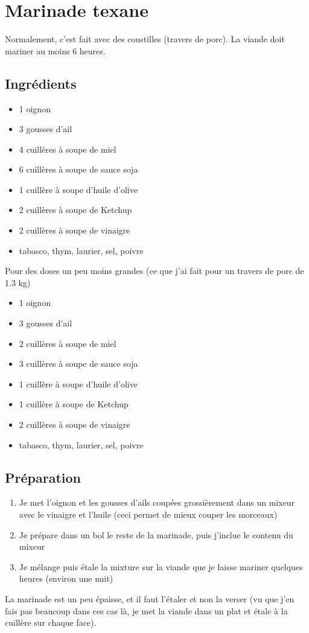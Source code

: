 \section{Marinade texane}
\begin{remarque}
Normalement, c'est fait avec des coustilles (travers de porc). La viande doit mariner au moins 6 heures.
\end{remarque}

\subsection*{Ingrédients}

\begin{itemize}
\item 1 oignon
\item 3 gousses d'ail
\item 4 cuillères à soupe de miel
\item 6 cuillères à soupe de sauce soja
\item 1 cuillère à soupe d'huile d'olive
\item 2 cuillères à soupe de Ketchup
\item 2 cuillères à soupe de vinaigre
\item tabasco, thym, laurier, sel, poivre
\end{itemize}

Pour des doses un peu moins grandes (ce que j'ai fait pour un travers de porc de 1.3 kg)
\begin{itemize}
\item 1 oignon
\item 3 gousses d'ail
\item 2 cuillères à soupe de miel
\item 3 cuillères à soupe de sauce soja
\item 1 cuillère à soupe d'huile d'olive
\item 1 cuillère à soupe de Ketchup
\item 2 cuillères à soupe de vinaigre
\item tabasco, thym, laurier, sel, poivre
\end{itemize}

\subsection*{Préparation}
\begin{enumerate}
\item Je met l'oignon et les gousses d'ails coupées grossièrement dans un mixeur avec le vinaigre et l'huile (ceci permet de mieux couper les morceaux)
\item Je prépare dans un bol le reste de la marinade, puis j'inclue le contenu du mixeur
\item Je mélange puis étale la mixture sur la viande que je laisse mariner quelques heures (environ une nuit)
\end{enumerate}

\begin{remarque}
La marinade est un peu épaisse, et il faut l'étaler et non la verser (vu que j'en fais pas beaucoup dans ces cas là, je met la viande dans un plat et étale à la cuillère sur chaque face).
\end{remarque}